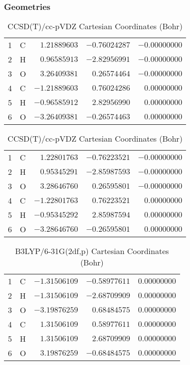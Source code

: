 \documentclass[10pt,oneside]{article}
\begin{document}
\begin{table}[h!]
\subsubsection*{Geometries}
\begin{multicols}{2}
\centering
\caption{CCSD(T)/cc-pVTZ Cartesian Coordinates (Bohr)}
\begin{tabular}{llrrr}
\toprule
1  & C  & $ 1.21889603$ & $-0.76024287$ & $-0.00000000$ \\
2  & H  & $ 0.96585913$ & $-2.82956991$ & $-0.00000000$ \\
3  & O  & $ 3.26409381$ & $ 0.26574464$ & $-0.00000000$ \\
4  & C  & $-1.21889603$ & $ 0.76024286$ & $ 0.00000000$ \\
5  & H  & $-0.96585912$ & $ 2.82956990$ & $ 0.00000000$ \\
6  & O  & $-3.26409381$ & $-0.26574463$ & $ 0.00000000$ \\
\bottomrule
\end{tabular}
\caption{CCSD(T)/cc-pVDZ Cartesian Coordinates (Bohr)}
\begin{tabular}{llrrr}
\toprule
1  & C  & $ 1.22801763$ & $-0.76223521$ & $-0.00000000$ \\
2  & H  & $ 0.95345291$ & $-2.85987593$ & $-0.00000000$ \\
3  & O  & $ 3.28646760$ & $ 0.26595801$ & $-0.00000000$ \\
4  & C  & $-1.22801763$ & $ 0.76223521$ & $ 0.00000000$ \\
5  & H  & $-0.95345292$ & $ 2.85987594$ & $ 0.00000000$ \\
6  & O  & $-3.28646760$ & $-0.26595801$ & $ 0.00000000$ \\
\bottomrule
\end{tabular}
\end{multicols}
\end{table}

\begin{table}[h]
\centering
\caption{B3LYP/6-31G(2df,p) Cartesian Coordinates (Bohr)}
\begin{tabular}{llrrr}
\toprule
1  & C  & $-1.31506109$ & $-0.58977611$ & $ 0.00000000$ \\
2  & H  & $-1.31506109$ & $-2.68709909$ & $ 0.00000000$ \\
3  & O  & $-3.19876259$ & $ 0.68484575$ & $ 0.00000000$ \\
4  & C  & $ 1.31506109$ & $ 0.58977611$ & $ 0.00000000$ \\
5  & H  & $ 1.31506109$ & $ 2.68709909$ & $ 0.00000000$ \\
6  & O  & $ 3.19876259$ & $-0.68484575$ & $ 0.00000000$ \\
\bottomrule
\end{tabular}
\end{table}
\end{document}
